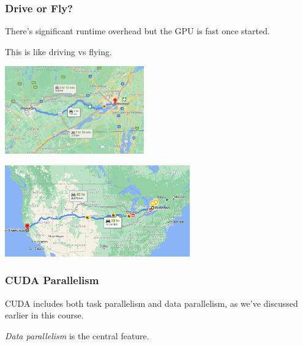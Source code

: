 \begin{frame}
\frametitle{Drive or Fly?}

There's significant runtime overhead but the GPU is fast once started.

This is like driving vs flying. 

\begin{center}
	\includegraphics[width=0.45\textwidth]{images/ott-mtl.png}
\end{center}

\begin{center}
	\includegraphics[width=0.6\textwidth]{images/waterloo-sfo.png}
\end{center}


\end{frame}


\begin{frame}
\frametitle{CUDA Parallelism}

CUDA includes both task parallelism and data parallelism, as we've
discussed earlier in this course.

\emph{Data parallelism} is the central feature. 

\end{frame}


